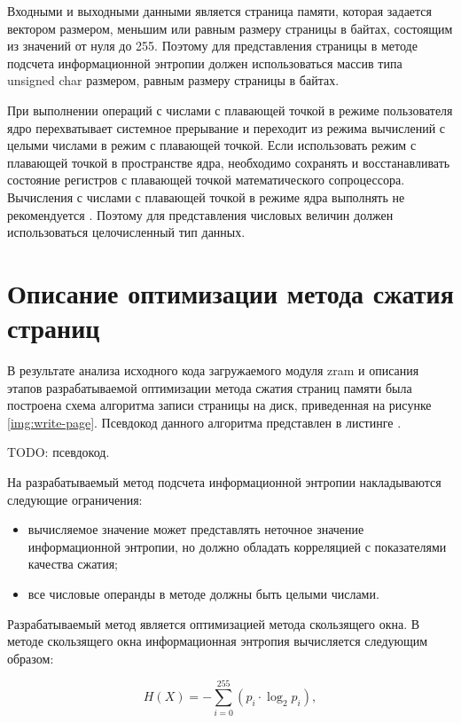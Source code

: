 Входными и выходными данными является страница памяти, которая задается вектором размером, меньшим или равным размеру страницы в байтах, состоящим из значений от нуля до 255. Поэтому для представления страницы в методе подсчета информационной энтропии должен использоваться массив типа unsigned char размером, равным размеру страницы в байтах.

При выполнении операций с числами с плавающей точкой в режиме пользователя ядро перехватывает системное прерывание и переходит из режима вычислений с целыми числами в режим с плавающей точкой. Если использовать режим с плавающей точкой в пространстве ядра, необходимо сохранять и восстанавливать состояние регистров с плавающей точкой математического сопроцессора. Вычисления с числами с плавающей точкой в режиме ядра выполнять не рекомендуется \cite{love}. Поэтому для представления числовых величин должен использоваться целочисленный тип данных. 

\section{Описание оптимизации метода сжатия страниц}

В результате анализа исходного кода загружаемого модуля zram \cite{zram-code} и описания этапов разрабатываемой оптимизации метода сжатия страниц памяти была построена схема алгоритма записи страницы на диск, приведенная на рисунке \ref{img:write-page}. Псевдокод данного алгоритма представлен в листинге .

TODO: псевдокод.

На разрабатываемый метод подсчета информационной энтропии накладываются следующие ограничения:

\begin{itemize}
	\item вычисляемое значение может представлять неточное значение информационной энтропии, но должно обладать корреляцией с показателями качества сжатия;
	\item все числовые операнды в методе должны быть целыми числами.
\end{itemize}

Разрабатываемый метод является оптимизацией метода скользящего окна. В методе скользящего окна информационная энтропия вычисляется следующим образом:

\begin{equation}
	H(X) = -\sum_{i = 0}^{255} (p_{i} \cdot \log_{2}p_{i}),
\end{equation}

